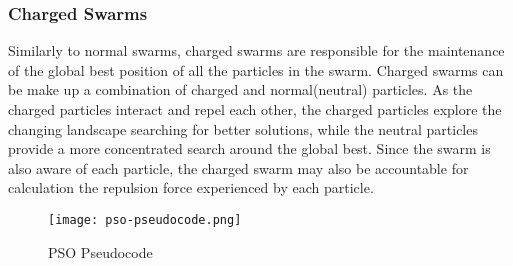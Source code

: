\subsubsection{Charged Swarms}
Similarly to normal swarms, charged swarms are responsible for the maintenance of the global best position of all the particles in the swarm. Charged swarms can be make up a combination of charged and normal(neutral) particles. As the charged particles interact and repel each other, the charged particles explore the changing landscape searching for better solutions, while the neutral particles provide a more concentrated search around the global best. Since the swarm is also aware of each particle, the charged swarm may also be accountable for calculation the repulsion force experienced by each particle.
 
\begin{figure}
  \centering
  \texttt{[image: pso-pseudocode.png]}
  \caption{PSO Pseudocode}
  \label{fig:pso-pseudocode}
\end{figure}
	
	


